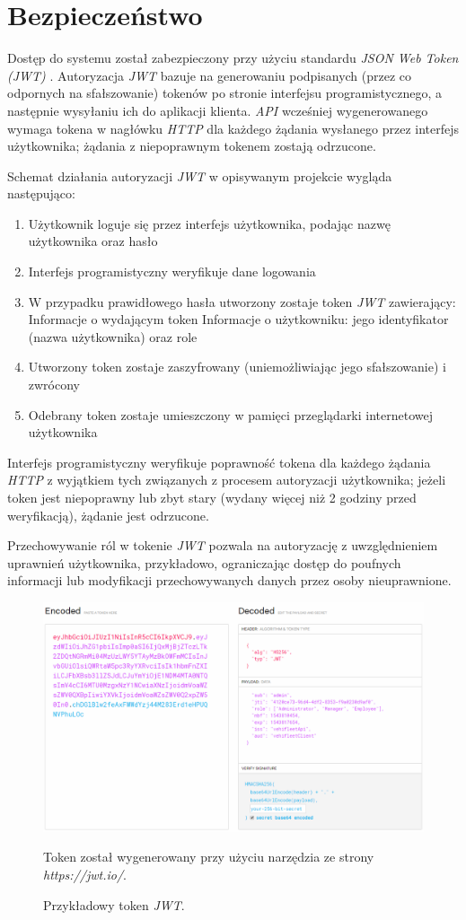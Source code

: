 \documentclass[eng,printmode,openany]{mgr}
\begin{document}
	
	\newpage
	\section{Bezpieczeństwo}
	Dostęp do systemu został zabezpieczony przy użyciu standardu \textit{JSON Web Token (JWT)} \cite{jwt}. Autoryzacja \textit{JWT} bazuje na generowaniu podpisanych (przez co odpornych na sfałszowanie) tokenów po stronie interfejsu programistycznego, a następnie wysyłaniu ich do aplikacji klienta. \textit{API} wcześniej wygenerowanego wymaga tokena w nagłówku \textit{HTTP} dla każdego żądania wysłanego przez interfejs użytkownika; żądania z niepoprawnym tokenem zostają odrzucone.
	
	Schemat działania autoryzacji \textit{JWT} w opisywanym projekcie wygląda następująco:
	\begin{enumerate}
		\item Użytkownik loguje się przez interfejs użytkownika, podając nazwę użytkownika oraz hasło
		\item Interfejs programistyczny weryfikuje dane logowania
		\item W przypadku prawidłowego hasła utworzony zostaje token \textit{JWT} zawierający:
		\subitem Informacje o wydającym token
		\subitem Informacje o użytkowniku: jego identyfikator (nazwa użytkownika) oraz role
		\item Utworzony token zostaje zaszyfrowany (uniemożliwiając jego sfałszowanie) i zwrócony	
		\item Odebrany token zostaje umieszczony w pamięci przeglądarki internetowej użytkownika
	\end{enumerate}
	Interfejs programistyczny weryfikuje poprawność tokena dla każdego żądania \textit{HTTP} z wyjątkiem tych związanych z procesem autoryzacji użytkownika; jeżeli token jest niepoprawny lub zbyt stary (wydany więcej niż 2 godziny przed weryfikacją), żądanie jest odrzucone.
	
	Przechowywanie ról w tokenie \textit{JWT} pozwala na autoryzację z uwzględnieniem uprawnień użytkownika, przykładowo, ograniczając dostęp do poufnych informacji lub modyfikacji przechowywanych danych przez osoby nieuprawnione.
	
	\begin{figure}[h]
		\centering
		\includegraphics[scale=0.54]{images/jwt.png}
		\caption{Przykładowy token \textit{JWT}.}
		\small 
		Token został wygenerowany przy użyciu narzędzia ze strony \textit{https://jwt.io/}.
	\end{figure}
	
\end{document}
